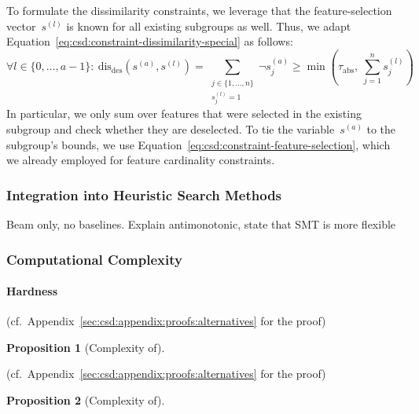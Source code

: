 \documentclass{article}
\newtheorem{proposition}{Proposition}
\theoremstyle{definition}
\begin{document}
To formulate the dissimilarity constraints, we leverage that the feature-selection vector~$s^{(l)}$ is known for all existing subgroups as well.
Thus, we adapt Equation~\ref{eq:csd:constraint-dissimilarity-special} as follows:
%
\begin{equation}
	\forall l \in \{0, \dots, a-1\}:~ \text{dis}_{\text{des}}(s^{(a)}, s^{(l)}) = \sum_{\substack{j \in \{1, \dots, n\} \\ s^{(l)}_j = 1}} \lnot s^{(a)}_j \geq \min \left( \tau_{\text{abs}},~\sum_{j=1}^n s^{(l)}_j \right)
	\label{eq:csd:constraint-dissimilarity-smt}
\end{equation}
%
In particular, we only sum over features that were selected in the existing subgroup and check whether they are deselected.
To tie the variable~$s^{(a)}$ to the subgroup's bounds, we use Equation~\ref{eq:csd:constraint-feature-selection}, which we already employed for feature cardinality constraints.

\subsubsection{Integration into Heuristic Search Methods}
\label{sec:csd:approach:alternatives:heuristics}

Beam only, no baselines.
Explain antimonotonic, state that SMT is more flexible

\subsubsection{Computational Complexity}
\label{sec:csd:approach:alternatives:complexity}

\paragraph{Hardness}

(cf.~Appendix~\ref{sec:csd:appendix:proofs:alternatives} for the proof)

\begin{proposition}[Complexity of]
	\label{prop:csd:complexity-alternatives-perfect-box}
\end{proposition}

(cf.~Appendix~\ref{sec:csd:appendix:proofs:alternatives} for the proof)

\begin{proposition}[Complexity of]
	\label{prop:csd:complexity-alternatives-imperfect-box}
\end{proposition}
\end{document}
